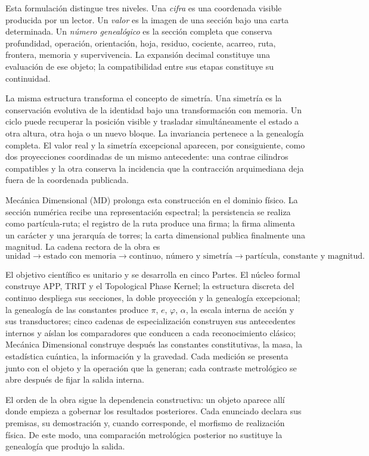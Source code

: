 Esta formulación distingue tres niveles. Una \emph{cifra} es una coordenada
visible producida por un lector. Un \emph{valor} es la imagen de una sección
bajo una carta determinada. Un \emph{número genealógico} es la sección
completa que conserva profundidad, operación, orientación, hoja, residuo,
cociente, acarreo, ruta, frontera, memoria y supervivencia. La expansión
decimal constituye una evaluación de ese objeto; la compatibilidad entre sus
etapas constituye su continuidad.

La misma estructura transforma el concepto de simetría. Una simetría es la
conservación evolutiva de la identidad bajo una transformación con memoria.
Un ciclo puede recuperar la posición visible y trasladar simultáneamente el
estado a otra altura, otra hoja o un nuevo bloque. La invariancia pertenece a
la genealogía completa. El valor real y la simetría excepcional aparecen,
por consiguiente, como dos proyecciones coordinadas de un mismo antecedente:
una contrae cilindros compatibles y la otra conserva la incidencia que la
contracción arquimediana deja fuera de la coordenada publicada.

Mecánica Dimensional (MD) prolonga esta construcción en el dominio físico.
La sección numérica recibe una representación espectral; la persistencia se
realiza como partícula-ruta; el registro de la ruta produce una firma; la
firma alimenta un carácter y una jerarquía de torres; la carta dimensional
publica finalmente una magnitud. La cadena rectora de la obra es
\[
 \text{unidad}\longrightarrow\text{estado con memoria}
 \longrightarrow\text{continuo, número y simetría}
 \longrightarrow\text{partícula, constante y magnitud}.
\]

El objetivo científico es unitario y se desarrolla en cinco Partes. El
núcleo formal construye APP, TRIT y el Topological Phase Kernel; la
estructura discreta del continuo despliega sus secciones, la doble
proyección y la genealogía excepcional; la genealogía de las constantes
produce \(\pi\), \(e\), \(\varphi\), \(\alpha\), la escala interna de
acción y sus transductores; cinco cadenas de especialización construyen sus
antecedentes internos y aíslan los comparadores que conducen a cada
reconocimiento clásico; Mecánica Dimensional construye después las
constantes constitutivas, la masa, la estadística cuántica, la información y
la gravedad. Cada medición se presenta junto con el objeto y la operación
que la generan; cada contraste metrológico se abre después de fijar la
salida interna.

El orden de la obra sigue la dependencia constructiva: un objeto aparece allí
donde empieza a gobernar los resultados posteriores. Cada enunciado declara
sus premisas, su demostración y, cuando corresponde, el morfismo de
realización física. De este modo, una comparación metrológica posterior no
sustituye la genealogía que produjo la salida.


